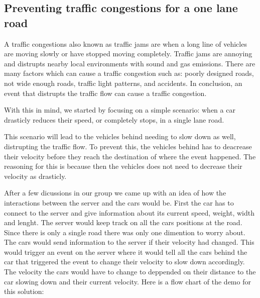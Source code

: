 \subsection{Preventing traffic congestions for a one lane road}

A traffic congestions also known as traffic jams are when a long line of vehicles are moving slowly or have stopped moving completely. Traffic jams are annoying and distrupts nearby local environments with sound and gas emissions. There are many factors which can cause a traffic congestion such as:
poorly designed roads, not wide enough roads, traffic light patterns, and accidents. In conclusion, an event that distrupts the traffic flow can cause a traffic congestion.

With this in mind, we started by focusing on a simple scenario: when a car drasticly reduces their speed, or completely stops, in a single lane road. 

This scenario will lead to the vehicles behind needing to slow down as well, distrupting the traffic flow. To prevent this, the vehicles behind has to deacrease their velocity before they reach the destination of where the event happened. The reasoning for this is because then the vehicles does not need to decrease their velocity as drasticly. 

After a few dicussions in our group we came up with an idea of how the interactions between the server and the cars would be. First the car has to connect to the server and give information about its current speed, weight, width and lenght. The server would keep track on all the cars positions at the road. Since there is only a single road there was only one dimention to worry about. The cars would send information to the server if their velocity had changed. This would trigger an event on the server where it would tell all the cars behind the car that triggered the event to change their velocity to slow down accordingly. The velocity the cars would have to change to deppended on their distance to the car slowing down and their current velocity. Here is a flow chart of the demo for this solution:

